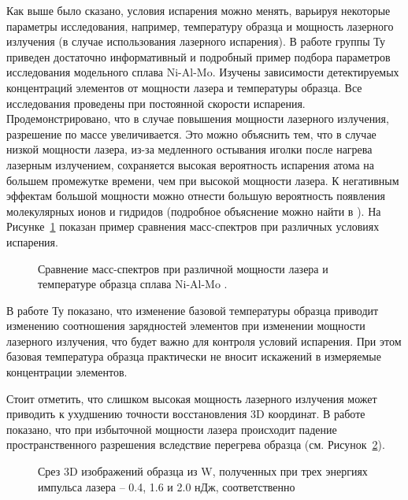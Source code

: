 Как выше было сказано, условия испарения можно менять, варьируя некоторые параметры исследования, например, температуру образца и мощность лазерного излучения (в случае использования лазерного испарения). В работе группы Ту \cite{Tu15} приведен достаточно информативный и подробный пример подбора параметров исследования модельного сплава Ni-Al-Mo. Изучены зависимости детектируемых концентраций элементов от мощности лазера и температуры образца. Все исследования проведены при постоянной скорости испарения. Продемонстрировано, что в случае повышения мощности лазерного излучения, разрешение по массе увеличивается. Это можно объяснить тем, что в случае низкой мощности лазера, из-за медленного остывания иголки после нагрева лазерным излучением, сохраняется высокая вероятность испарения атома на большем промежутке времени, чем при высокой мощности лазера. К негативным эффектам большой мощности можно отнести большую вероятность появления молекулярных ионов и гидридов (подробное объяснение можно найти в \cite{GaultBOOK}). На Рисунке~\cref{fig:ParamsPower} показан пример сравнения масс-спектров при различных условиях испарения.

\begin{figure}[htb]
	\caption{Сравнение масс-спектров при различной мощности лазера и температуре образца сплава Ni-Al-Mo \cite{Tu15}.}
	\label{fig:ParamsPower}
\end{figure}

В работе Ту \cite{Tu15} показано, что изменение базовой температуры образца приводит изменению соотношения зарядностей элементов при изменении мощности лазерного излучения, что будет важно для контроля условий испарения. При этом базовая температура образца практически не вносит искажений в измеряемые концентрации элементов.

Стоит отметить, что слишком высокая мощность лазерного излучения может приводить к ухудшению точности восстановления 3D координат. В работе \cite{Cerezo07} показано, что при избыточной мощности лазера происходит падение пространственного разрешения вследствие перегрева образца (см. Рисунок~\cref{fig:ParamsEnergy}).

\begin{figure}[htb]
	\caption{Срез 3D изображений образца из W, полученных при трех энергиях импульса лазера – 0.4, 1.6 и 2.0 нДж, соответственно~\cite{Cerezo07}}
	\label{fig:ParamsEnergy}
\end{figure}

